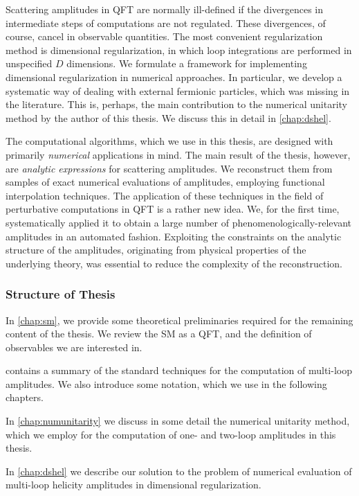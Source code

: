 Scattering amplitudes in QFT are normally ill-defined if the divergences
in intermediate steps of computations are not regulated.
These divergences, of course, cancel in observable quantities.
The most convenient regularization method is dimensional regularization,
in which loop integrations are performed in unspecified $D$ dimensions.
We formulate a framework for implementing dimensional regularization in numerical approaches.
In particular, we develop a systematic way of dealing with external fermionic particles,
which was missing in the literature.
This is, perhaps, the main contribution to the numerical unitarity method by the author of this thesis.
We discuss this in detail in \cref{chap:dshel}.

The computational algorithms, which we use in this thesis, are designed with primarily \emph{numerical} applications in mind.
The main result of the thesis, however, are \emph{analytic expressions} for scattering amplitudes.
We reconstruct them from samples of exact numerical evaluations of amplitudes,
employing functional interpolation techniques.
The application of these techniques in the field of perturbative computations in QFT is a rather new idea.
We, for the first time, systematically applied it to obtain a large number of phenomenologically-relevant amplitudes in an automated fashion. 
Exploiting the constraints on the analytic structure of the amplitudes, originating
from physical properties of the underlying theory, was essential to reduce the complexity of the reconstruction.

\subsubsection{Structure of Thesis}

In \cref{chap:sm}, we provide some theoretical preliminaries required for the remaining 
content of the thesis.
We review the SM as a QFT, and  the definition of observables we are interested in.

 contains a summary of the standard techniques for the computation of multi-loop amplitudes.
We also introduce some notation, which we use in the following chapters.

In \cref{chap:numunitarity} we discuss in some detail the numerical unitarity method, which we employ for the computation
of one- and two-loop amplitudes in this thesis.

In \cref{chap:dshel} we describe our solution to the problem of numerical evaluation of multi-loop helicity amplitudes in dimensional regularization.

